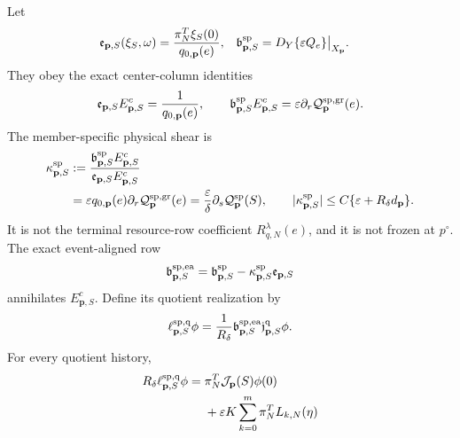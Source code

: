 \begin{theorem}
Let
\begin{align}
 \mathfrak e_{\mathbf p,S}(\xi_S,\omega)
 &=\frac{\pi_N^T\xi_S(0)}{q_{0,\mathbf p}(e)},&
 \mathfrak b_{\mathbf p,S}^{\rm sp}
 &=D_Y\{\varepsilon Q_e\}\big|_{X_{\mathbf p}}.
                                                        \label{eq:oe-family-speed-full-rows}
\end{align}
They obey the exact center-column identities
\begin{equation}
 \mathfrak e_{\mathbf p,S}E_{\mathbf p,S}^c
 =\frac1{q_{0,\mathbf p}(e)},\qquad
 \mathfrak b_{\mathbf p,S}^{\rm sp}E_{\mathbf p,S}^c
 =\varepsilon\partial_r
       \mathcal Q_{\mathbf p}^{\rm sp,gr}(e).
                                                        \label{eq:oe-family-speed-center-columns}
\end{equation}
The member-specific physical shear is
\begin{align}
 \kappa_{\mathbf p,S}^{\rm sp}
 &:=
 \frac{\mathfrak b_{\mathbf p,S}^{\rm sp}E_{\mathbf p,S}^c}
      {\mathfrak e_{\mathbf p,S}E_{\mathbf p,S}^c}\notag\\
 &=\varepsilon q_{0,\mathbf p}(e)
       \partial_r\mathcal Q_{\mathbf p}^{\rm sp,gr}(e)
 =\frac{\varepsilon}{\delta}
       \partial_s\mathcal Q_{\mathbf p}^{\rm sp}(S),
 \qquad
 |\kappa_{\mathbf p,S}^{\rm sp}|
 \le C\{\varepsilon+R_\delta d_{\mathbf p}\}.
                                                        \label{eq:oe-family-speed-shear}
\end{align}
It is not the terminal resource-row coefficient
\(R_{q,N}^{\lambda}(e)\), and it is not frozen at \(p^\circ\).
The exact event-aligned row
\begin{equation}
 \mathfrak b_{\mathbf p,S}^{\rm sp,ea}
 =\mathfrak b_{\mathbf p,S}^{\rm sp}
       -\kappa_{\mathbf p,S}^{\rm sp}\mathfrak e_{\mathbf p,S}
                                                        \label{eq:oe-family-speed-event-row}
\end{equation}
annihilates \(E_{\mathbf p,S}^c\).  Define its quotient realization by
\begin{equation}
 \ell_{\mathbf p,S}^{\rm sp,q}\phi
 =\frac1{R_\delta}
   \mathfrak b_{\mathbf p,S}^{\rm sp,ea}
       \mathfrak j_{\mathbf p,S}^{\rm q}\phi.    \label{eq:oe-family-speed-quotient-row}
\end{equation}
For every quotient history,
\begin{align}
 R_\delta\ell_{\mathbf p,S}^{\rm sp,q}\phi
={}&\pi_N^T\mathcal J_{\mathbf p}(S)\phi(0)\notag\\
&+\varepsilon K\sum_{k=0}^m\pi_N^TL_{k,N}(\eta)

\end{align}
\end{theorem}
